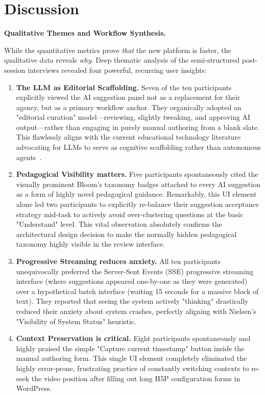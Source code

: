 \section{Discussion}

\textbf{Qualitative Themes and Workflow Synthesis.}

While the quantitative metrics prove \emph{that} the new platform is faster, the qualitative data reveals \emph{why}. Deep thematic analysis of the semi-structured post-session interviews revealed four powerful, recurring user insights:

\begin{enumerate}
    \item \textbf{The LLM as Editorial Scaffolding.} Seven of the ten participants explicitly viewed the AI suggestion panel not as a replacement for their agency, but as a primary workflow anchor. They organically adopted an "editorial curation" model—reviewing, slightly tweaking, and approving AI output—rather than engaging in purely manual authoring from a blank slate. This flawlessly aligns with the current educational technology literature advocating for LLMs to serve as cognitive scaffolding rather than autonomous agents~\cite{hwang2020}.
    \item \textbf{Pedagogical Visibility matters.} Five participants spontaneously cited the visually prominent Bloom's taxonomy badges attached to every AI suggestion as a form of highly novel pedagogical guidance. Remarkably, this UI element alone led two participants to explicitly re-balance their suggestion acceptance strategy mid-task to actively avoid over-clustering questions at the basic "Understand" level. This vital observation absolutely confirms the architectural design decision to make the normally hidden pedagogical taxonomy highly visible in the review interface.
    \item \textbf{Progressive Streaming reduces anxiety.} All ten participants unequivocally preferred the Server-Sent Events (SSE) progressive streaming interface (where suggestions appeared one-by-one as they were generated) over a hypothetical batch interface (waiting 15 seconds for a massive block of text). They reported that seeing the system actively "thinking" drastically reduced their anxiety about system crashes, perfectly aligning with Nielsen's "Visibility of System Status" heuristic.
    \item \textbf{Context Preservation is critical.} Eight participants spontaneously and highly praised the simple "Capture current timestamp" button inside the manual authoring form. This single UI element completely eliminated the highly error-prone, frustrating practice of constantly switching contexts to re-seek the video position after filling out long H5P configuration forms in WordPress.
\end{enumerate}

